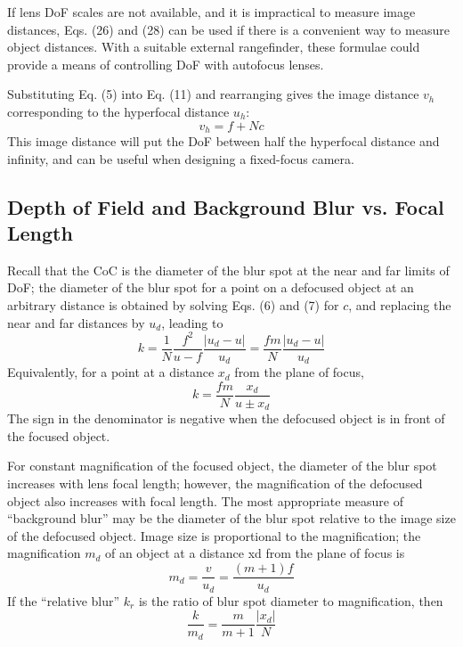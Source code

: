 \documentclass[11pt, oneside]{scrartcl}   	%
\begin{document}
If lens DoF scales are not available, and it is impractical to measure image distances, Eqs. (26) and (28) can be used if there is a convenient way to measure object distances. With a suitable external rangefinder, these formulae could provide a means of controlling DoF with autofocus lenses.

Substituting Eq. (5) into Eq. (11) and rearranging gives the image distance $v_h$ corresponding to the hyperfocal distance $u_h$:
\begin{equation}
   v_h = f + N\!c
   \label{eq:vh} 
\end{equation}
This image distance will put the DoF between half the hyperfocal distance and infinity, and
can be useful when designing a fixed-focus camera.
\subsection{Depth of Field and Background Blur vs. Focal Length}

Recall that the CoC is the diameter of the blur spot at the near and far limits of DoF; the diameter of the blur spot for a point on a defocused object at an arbitrary distance is obtained by solving Eqs. (6) and (7) for $c$, and replacing the near and far distances by $u_d$, leading to
\begin{equation}
   k = \frac1N \frac{f^2}{u-f}  \frac{|u_d - u|}{u_d} = \frac{fm}N \frac{|u_d - u|}{u_d}
   \label{eq:k1}
\end{equation}
Equivalently, for a point at a distance $x_d$ from the plane of focus, 
\begin{equation}
   k = \frac{fm}N \frac{x_d}{u\pm x_d}
   \label{eq:k2}
\end{equation}
 The sign in the denominator is negative when the defocused object is in front of the focused object.

 For constant magnification of the focused object, the diameter of the blur spot increases with lens focal length; however, the magnification of the defocused object also increases with focal length. The most appropriate measure of “background blur” may be the diameter of the blur spot relative to the image size of the defocused object. Image size is proportional to the magnification; the magnification $m_d$ of an object at a distance xd from the plane of focus is
\begin{equation}
   m_d = \frac v {u_d} = \frac{(m+1)f}{u_d} 
   \label{eq:md}
\end{equation}
If the “relative blur” $k_r$ is the ratio of blur spot diameter to magnification, then
\begin{equation}
    \frac k{m_d} = \frac m{m+1}\frac{|x_d|}N
    \label{eq:km}
\end{equation}
\end{document}
